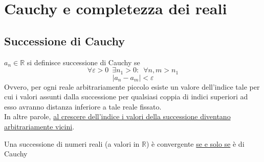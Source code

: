\documentclass[10pt, oneside]{book}
\theoremstyle{plain}
\begin{document}
\section{Cauchy e completezza dei reali}
\subsection{Successione di Cauchy}
\begin{defin}
$a_n \in \mathbb{R}$ si definisce successione di Cauchy se
\[\forall \varepsilon > 0 \enspace \exists n_1 > 0 : \enspace \forall n, m > n_1\]
\[|a_n - a_m| < \varepsilon\]
Ovvero, per ogni reale arbitrariamente piccolo esiste un valore dell'indice tale per cui i valori assunti dalla successione per qualsiasi coppia di indici superiori ad esso avranno distanza inferiore a tale reale fissato. \\
In altre parole, \underline{al crescere dell'indice i valori della successione diventano arbitrariamente vicini}.
\end{defin}
\begin{ther}
Una successione di numeri reali (a valori in $\mathbb{R}$) è convergente \underline{se e solo se} è di Cauchy
\end{ther}
\end{document}
